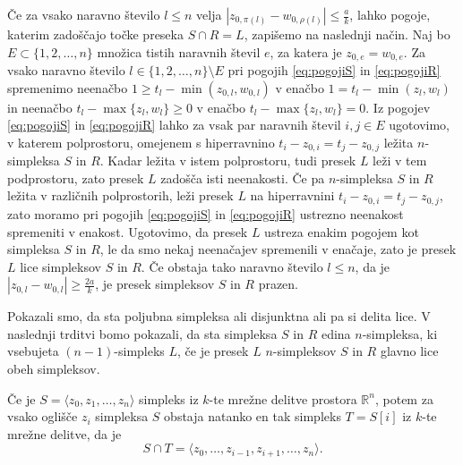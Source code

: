 \documentclass[mat1]{fmfdelo}
\newcommand{\R}{\mathbb R}
\newcommand{\0}{0}
\begin{document}
Če za vsako naravno število $l \leq n$ velja $|z_{0, \pi(l)} - w_{0, \rho(l)}| \leq \frac{a}{k}$, lahko pogoje, katerim zadoščajo točke preseka $S \cap R = L$, zapišemo na naslednji način. Naj bo $E \subset \{1, 2, \dots, n \}$ množica tistih naravnih števil $e$, za katera je $z_{0,e} = w_{0, e}$. Za vsako naravno število $l \in \{1, 2, \dots, n \} \setminus E$ pri pogojih \eqref{eq:pogojiS} in \eqref{eq:pogojiR} spremenimo neenačbo $1 \geq t_l - \min(z_{0, l}, w_{0, l})$ v enačbo $1 = t_l - \min(z_l, w_l)$ in neenačbo $t_l - \max \{z_l, w_l \} \geq 0$ v enačbo $t_l - \max \{z_l, w_l \} = 0$. 
Iz pogojev \eqref{eq:pogojiS} in \eqref{eq:pogojiR} lahko za vsak par naravnih števil $i, j \in E$ ugotovimo, v katerem polprostoru, omejenem s hiperravnino $t_i - z_{0, i} = t_j - z_{0, j}$ ležita $n$-simpleksa $S$ in $R$. Kadar ležita v istem polprostoru, tudi presek $L$ leži v tem podprostoru, zato presek $L$ zadošča isti neenakosti. Če pa $n$-simpleksa $S$ in $R$ ležita v različnih polprostorih, leži presek $L$ na hiperravnini $t_i - z_{0, i} = t_j - z_{0, j}$, zato moramo pri pogojih \eqref{eq:pogojiS} in \eqref{eq:pogojiR} ustrezno neenakost spremeniti v enakost. Ugotovimo, da presek $L$ ustreza enakim pogojem kot simpleksa $S$ in $R$, le da smo nekaj neenačajev spremenili v enačaje, zato je presek $L$ lice simpleksov $S$ in $R$.
Če obstaja tako naravno število $l \leq n$, da je $|z_{0, l} - w_{0, l}| \geq \frac{2a}{k}$, je presek simpleksov $S$ in $R$ prazen.

Pokazali smo, da sta poljubna simpleksa ali disjunktna ali pa si delita lice. V naslednji trditvi bomo pokazali, da sta simpleksa $S$ in $R$ edina $n$-simpleksa, ki vsebujeta $(n-1)$-simpleks $L$, če je presek $L$ $n$-simpleksov $S$ in $R$ glavno lice obeh simpleksov.
\begin{trditev}
Če je $S = \langle z_0, z_1, \dots, z_n \rangle$ simpleks iz $k$-te mrežne delitve prostora $\R^n$, potem za vsako oglišče $z_i$ simpleksa $S$ obstaja natanko en tak simpleks $T = S[i]$ iz $k$-te mrežne delitve, da je 
$$S \cap T = \langle z_0, \dots, z_{i-1}, z_{i+1}, \dots, z_n \rangle.$$
\end{trditev}
\end{document}
